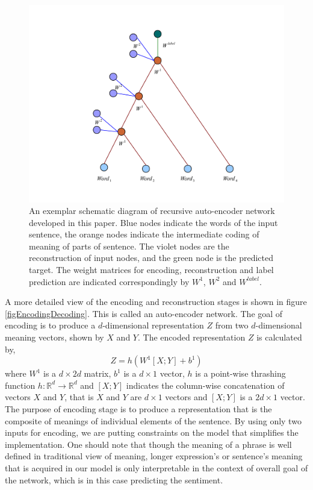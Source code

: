 \documentclass[twoside,12pt]{article}
\begin{document}
\begin{figure}[ht!]
\centering
\includegraphics[width=.8\textwidth]{raenet.pdf}
\caption{An exemplar schematic diagram of recursive auto-encoder network developed in this paper. Blue nodes indicate the words of the input sentence, the orange nodes indicate the intermediate coding of meaning of parts of sentence. The violet nodes are the reconstruction of input nodes, and the green node is the predicted target. The weight matrices for encoding, reconstruction and label prediction are indicated correspondingly by $W^1$, $W^2$ and $W^{label}$. }
\label{figRAE}
\end{figure}


A more detailed view of the encoding and reconstruction stages is shown in figure \ref{figEncodingDecoding}. This is called an auto-encoder network. The goal of encoding is to produce a $d$-dimensional representation $Z$ from two $d$-dimensional meaning vectors, shown by $X$ and $Y$. The encoded representation $Z$ is calculated by,
\begin{equation}
Z = h(W^1 [X;Y] + b^1)
\label{eqEncoding}
\end{equation}
where $W^1$ is a $d\times 2d$ matrix, $b^1$ is a $d\times 1$ vector, $h$ is a point-wise thrashing function $h: \mathbb{R}^d \rightarrow \mathbb{R}^d$ and $[X;Y]$ indicates the column-wise concatenation of vectors $X$ and $Y$, that is $X$ and $Y$ are $d\times 1$ vectors and $[X;Y]$ is a $2d\times 1$ vector. The purpose of encoding stage is to produce a representation that is the composite of meanings of individual elements of the sentence. By using only two inputs for encoding, we are putting constraints on the model that simplifies the implementation. One should note that though the meaning of a phrase is well defined in traditional view of meaning, longer expression's or sentence's meaning that is acquired in our model is only interpretable in the context of overall goal of the network, which is in this case predicting the sentiment.
\end{document}

